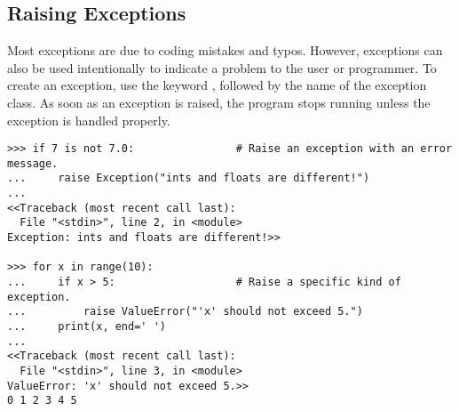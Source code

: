 \subsection*{Raising Exceptions} %

Most exceptions are due to coding mistakes and typos.
However, exceptions can also be used intentionally to indicate a problem to the user or programmer.
To create an exception, use the keyword , followed by the name of the exception class.
As soon as an exception is raised, the program stops running unless the exception is handled properly.


\begin{lstlisting}
>>> if 7 is not 7.0:                # Raise an exception with an error message.
...     raise Exception("ints and floats are different!")
...
<<Traceback (most recent call last):
  File "<stdin>", line 2, in <module>
Exception: ints and floats are different!>>

>>> for x in range(10):
...     if x > 5:                   # Raise a specific kind of exception.
...         raise ValueError("'x' should not exceed 5.")
...     print(x, end=' ')
...
<<Traceback (most recent call last):
  File "<stdin>", line 3, in <module>
ValueError: 'x' should not exceed 5.>>
0 1 2 3 4 5
\end{lstlisting}

